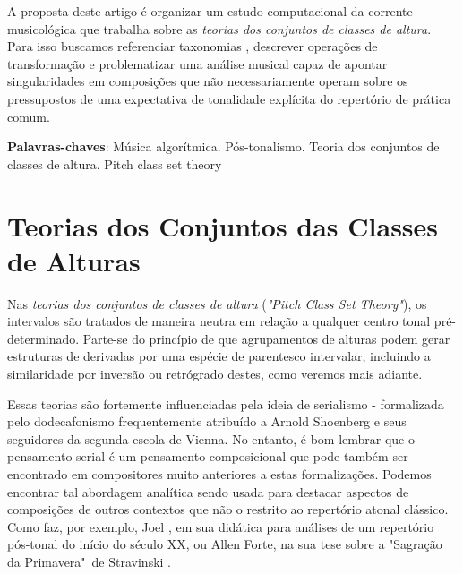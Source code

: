 \documentclass[
	12pt,				%
	openright,			%
	twoside,			%
	a4paper,			%
	english,			%
	french,				%
	spanish,			%
	brazil				%
	]{abntex2}
\begin{document}
\frenchspacing 


\imprimircapa

\imprimirfolhaderosto

\setlength{\absparsep}{18pt} %
\begin{resumo}


A proposta deste artigo é organizar um estudo computacional da corrente musicológica que trabalha sobre as \textit{teorias dos conjuntos de classes de altura}. Para isso buscamos referenciar taxonomias \cite{forte1973structure}, descrever operações de transformação \cite{straus2004} e problematizar uma análise musical capaz de apontar singularidades em composições \cite{lester1989analytic,straus2004} que não necessariamente operam sobre os pressupostos de uma expectativa de tonalidade explícita do repertório de prática comum.



 \textbf{Palavras-chaves}: Música algorítmica. Pós-tonalismo. Teoria dos conjuntos de classes de altura. Pitch class set theory
\end{resumo}





\chapter{Teorias dos Conjuntos das Classes de Alturas }
\label{modelos}

Nas \textit{teorias dos conjuntos de classes de altura} (\textit{"Pitch Class Set Theory"}), os intervalos são tratados de maneira neutra em relação a qualquer centro tonal pré-determinado. Parte-se do princípio de que agrupamentos de alturas podem gerar estruturas de derivadas por uma espécie de parentesco intervalar, incluindo a similaridade por inversão ou retrógrado destes, como veremos mais adiante. 

Essas teorias são fortemente influenciadas pela ideia de serialismo - formalizada pelo dodecafonismo frequentemente atribuído a Arnold Shoenberg e seus seguidores da segunda escola de Vienna. No entanto, é bom lembrar que o pensamento serial é um pensamento composicional que pode também ser encontrado em compositores muito anteriores a estas formalizações\cite{lester1989analytic}. Podemos encontrar tal abordagem analítica sendo usada para destacar aspectos de composições de outros contextos que não o restrito ao repertório atonal clássico. Como faz, por exemplo, Joel , em sua didática para análises de um repertório pós-tonal do início do século XX, ou Allen Forte, na sua tese sobre a "Sagração da Primavera"\ de Stravinski \cite{forte1978harmonic}.
\end{document}
